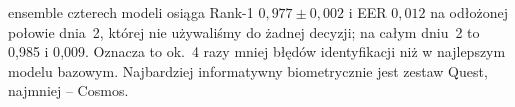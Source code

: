 ensemble czterech modeli osiąga Rank-1 $0{,}977 \pm 0{,}002$ i EER $0{,}012$ na odłożonej połowie
dnia~2, której nie używaliśmy do żadnej decyzji; na całym dniu~2 to 0{,}985 i 0{,}009. Oznacza to
ok.~4 razy mniej błędów identyfikacji niż w najlepszym modelu bazowym. Najbardziej informatywny
biometrycznie jest zestaw Quest, najmniej -- Cosmos.
